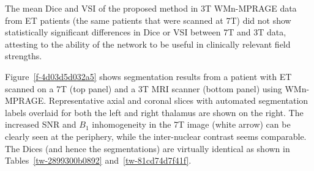 The mean Dice and VSI of the proposed method in 3T WMn-MPRAGE data from ET patients (the same patients that were scanned at 7T) did not show statistically significant differences in Dice or VSI between 7T and 3T data, attesting to the ability of the network to be useful in clinically relevant field strengths. 

Figure~\ref{f-4d03d5d032a5}  shows segmentation results from a patient with ET scanned on a 7T (top panel) and a 3T MRI scanner (bottom panel) using WMn-MPRAGE. Representative axial and coronal slices with automated segmentation labels overlaid for both the left and right thalamus are shown on the right. The increased SNR and $B_1$ inhomogeneity in the 7T image (white arrow) can be clearly seen at the periphery, while the inter-nuclear contrast seems comparable. The Dices (and hence the segmentations) are virtually identical as shown in Tables~\ref{tw-2899300b0892} and~\ref{tw-81cd74d7f41f}.

